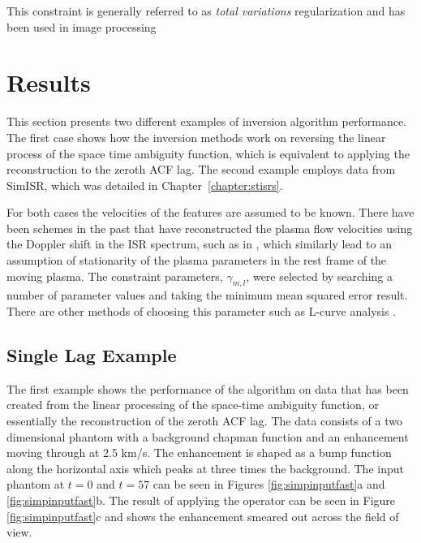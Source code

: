 \noindent This constraint is generally referred to as \textit{total variations} regularization and has been used in image processing \citep{Rudin:1992kn}

\section{Results}
\label{sec:results}
This section presents two different examples of inversion algorithm performance. The first case shows how  the inversion methods work on reversing the linear process of the space time ambiguity function, which is equivalent to applying the reconstruction to the zeroth ACF lag. The second example employs data from SimISR, which was detailed in Chapter~\ref{chapter:stisrs}.

For both cases the velocities of the features are assumed to be known. There have been schemes in the past that have reconstructed the plasma flow velocities using the Doppler shift in the ISR spectrum, such as in \citet{butler:imagingfregiondrifts}, which similarly lead to an assumption of stationarity of the plasma parameters in the rest frame of the moving plasma. The constraint parameters, $\gamma_{m,l}$, were selected by searching a number of parameter values and taking the minimum mean squared error result. There are other methods of choosing this parameter such as L-curve analysis \citep{Karl:2005jy}. 

\subsection{Single Lag Example}

The first example shows the performance of the algorithm on data that has been created from the linear processing of the space-time ambiguity function, or essentially the reconstruction of the zeroth ACF lag. The data consists of a two dimensional phantom with a background chapman function and an enhancement moving through at 2.5 km/s. The enhancement is shaped as a bump function along the horizontal axis which peaks at three times the background. The input phantom at $t=0$ and $t=57$ can be seen in Figures \ref{fig:simpinputfast}a and \ref{fig:simpinputfast}b. The result of applying the operator can be seen in Figure \ref{fig:simpinputfast}c and shows the enhancement smeared out across the field of view.

